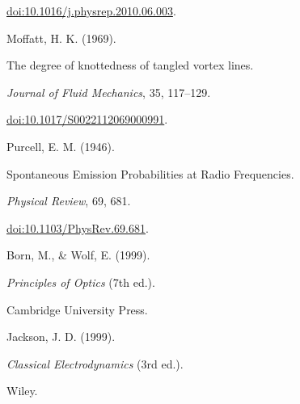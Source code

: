 \documentclass[12pt]{article}
\begin{document}
\begin{thebibliography}{99}
\newblock \href{https://doi.org/10.1016/j.physrep.2010.06.003}{doi:10.1016/j.physrep.2010.06.003}.


Moffatt, H. K. (1969).

\newblock The degree of knottedness of tangled vortex lines.

\newblock \emph{Journal of Fluid Mechanics}, 35, 117–129.

\newblock \href{https://doi.org/10.1017/S0022112069000991}{doi:10.1017/S0022112069000991}.


Purcell, E. M. (1946).

\newblock Spontaneous Emission Probabilities at Radio Frequencies.

\newblock \emph{Physical Review}, 69, 681.

\newblock \href{https://doi.org/10.1103/PhysRev.69.681}{doi:10.1103/PhysRev.69.681}.


Born, M., & Wolf, E. (1999).

\newblock \emph{Principles of Optics} (7th ed.).

\newblock Cambridge University Press.



Jackson, J. D. (1999).

\newblock \emph{Classical Electrodynamics} (3rd ed.).

\newblock Wiley.


\end{thebibliography}
\end{document}
